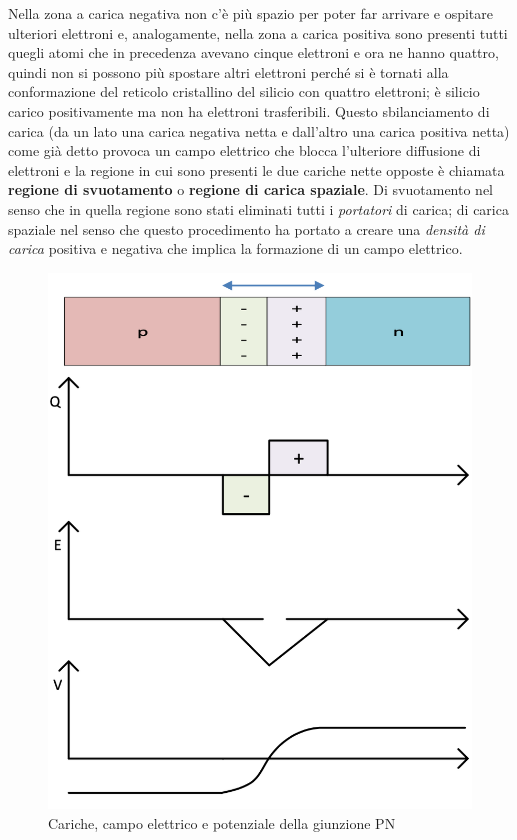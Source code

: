 \documentclass[12pt, a4paper]{report}
\begin{document}
Nella zona a carica negativa non c'è più spazio per poter far arrivare e ospitare ulteriori elettroni e, analogamente, nella zona a carica positiva sono presenti tutti quegli atomi che in precedenza avevano cinque elettroni e ora ne hanno quattro, quindi non si possono più spostare altri elettroni perché si è tornati alla conformazione del reticolo cristallino del silicio con quattro elettroni; è silicio carico positivamente ma non ha elettroni trasferibili. Questo sbilanciamento di carica (da un lato una carica negativa netta e dall'altro una carica positiva netta) come già detto provoca un campo elettrico che blocca l'ulteriore diffusione di elettroni e la regione in cui sono presenti le due cariche nette opposte è chiamata \textbf{regione di svuotamento} o \textbf{regione di carica spaziale}. Di svuotamento nel senso che in quella regione sono stati eliminati tutti i \textit{portatori} di carica; di carica spaziale nel senso che questo procedimento ha portato a creare una \textit{densità di carica} positiva e negativa che implica la formazione di un campo elettrico.
\begin{figure}[h]
\centering
\includegraphics[scale=0.45,angle=0]{giunzione_pn_grafici.png}
\caption{Cariche, campo elettrico e potenziale della giunzione PN}
\label{grafici}
\end{figure}
\end{document}
